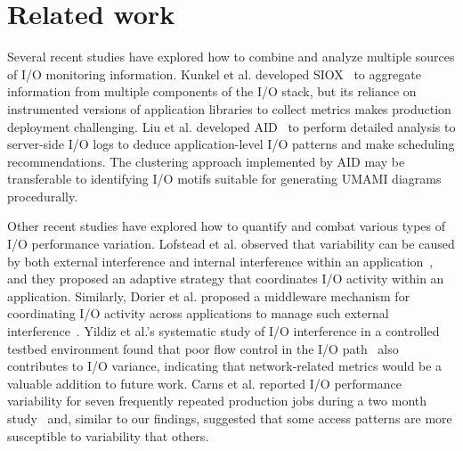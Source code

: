 \section{Related work} \label{sec:related}

Several recent studies have explored how to combine and analyze multiple sources of I/O monitoring information.
Kunkel et al. developed SIOX~\cite{Kunkel:2014:SAC:2769884.2769901} to aggregate information from multiple components of the I/O stack, 
but its reliance on instrumented versions of application libraries to collect metrics makes production deployment challenging.
Liu et al. developed AID~\cite{Liu2016} to perform detailed analysis to server-side I/O logs to deduce application-level I/O patterns and make scheduling recommendations.  The clustering approach implemented by AID may be transferable to identifying I/O motifs suitable for generating UMAMI diagrams procedurally.

Other recent studies have explored how to quantify and combat various types of I/O performance variation.
Lofstead et al. observed that variability can be caused by both external interference and internal interference within an application~\cite{Lofstead2010}, and they proposed an adaptive strategy that coordinates I/O activity within an application.
Similarly, Dorier et al. proposed a middleware mechanism for coordinating I/O activity across applications to manage such external interference~\cite{dorier2014calciom}.
Yildiz et al.'s systematic study of I/O interference in a controlled testbed environment found that poor flow control in the I/O path~\cite{Yildiz2016} also contributes to I/O variance, indicating that network-related metrics would be a valuable addition to future work.
Carns et al. reported I/O performance variability for seven frequently repeated production jobs during a two month study~\cite{carns2011understanding} and, similar to our findings, suggested that some access patterns are more susceptible to variability that others.